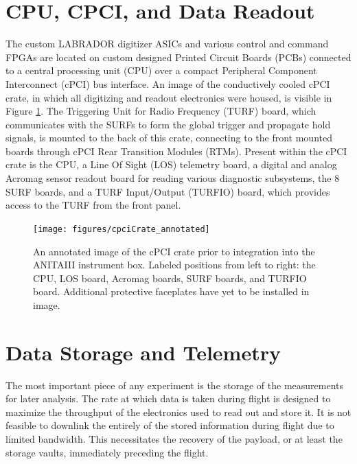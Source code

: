\section{CPU, CPCI, and Data Readout}
	The custom LABRADOR digitizer ASICs and various control and command FPGAs are located on custom designed Printed Circuit Boards (PCBs) connected to a central processing unit (CPU) over a compact Peripheral Component Interconnect (cPCI) bus interface.  An image of the conductively cooled cPCI crate, in which all digitizing and readout electronics were housed, is visible in Figure \ref{fig:CPCIcrate}.  The Triggering Unit for Radio Frequency (TURF) board, which communicates with the SURFs to form the global trigger and propagate hold signals, is mounted to the back of this crate, connecting to the front mounted boards through cPCI Rear Transition Modules (RTMs).  Present within the cPCI crate is the CPU, a Line Of Sight (LOS) telemetry board, a digital and analog Acromag sensor readout board for reading various diagnostic subsystems, the 8 SURF boards,  and a TURF Input/Output (TURFIO) board, which provides access to the TURF from the front panel.
	
\begin{figure}
	\centering
	\texttt{[image: figures/cpciCrate\_annotated]}
	\caption{An annotated image of the cPCI crate prior to integration into the ANITAIII instrument box.  Labeled positions from left to right: the CPU, LOS board, Acromag boards, SURF boards, and TURFIO board.  Additional protective faceplates have yet to be installed in image.}
	\label{fig:CPCIcrate}
\end{figure}
	
	
\section{Data Storage and Telemetry}
	The most important piece of any experiment is the storage of the measurements for later analysis.  The rate at which data is taken during flight is designed to maximize the throughput of the electronics used to read out and store it.  It is not feasible to downlink the entirely of the stored information during flight due to limited bandwidth.  This necessitates the recovery of the payload, or at least the storage vaults, immediately preceding the flight.

